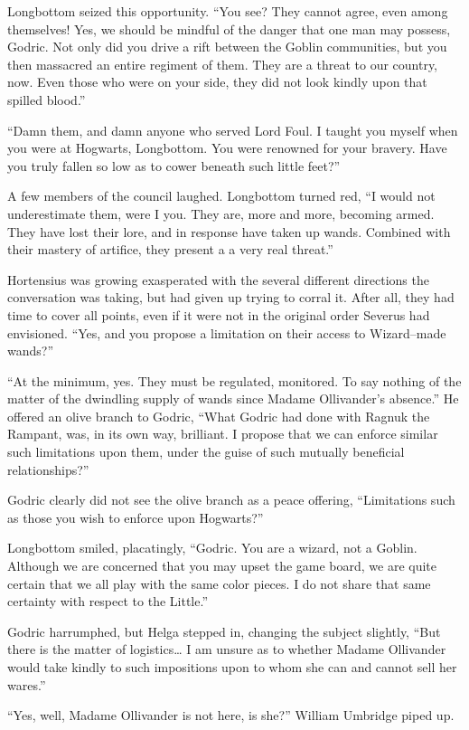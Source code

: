 Longbottom seized this opportunity. “You see? They cannot agree, even among themselves! Yes, we should be mindful of the danger that one man may possess, Godric. Not only did you drive a rift between the Goblin communities, but you then massacred an entire regiment of them. They are a threat to our country, now. Even those who were on your side, they did not look kindly upon that spilled blood.”

“Damn them, and damn anyone who served Lord Foul. I taught you myself when you were at Hogwarts, Longbottom. You were renowned for your bravery. Have you truly fallen so low as to cower beneath such little feet?”

A few members of the council laughed. Longbottom turned red, “I would not underestimate them, were I you. They are, more and more, becoming armed. They have lost their lore, and in response have taken up wands. Combined with their mastery of artifice, they present a a very real threat.”

Hortensius was growing exasperated with the several different directions the conversation was taking, but had given up trying to corral it. After all, they had time to cover all points, even if it were not in the original order Severus had envisioned. “Yes, and you propose a limitation on their access to Wizard\mbox{--}made wands?”

“At the minimum, yes. They must be regulated, monitored. To say nothing of the matter of the dwindling supply of wands since Madame Ollivander’s absence.” He offered an olive branch to Godric, “What Godric had done with Ragnuk the Rampant, was, in its own way, brilliant. I propose that we can enforce similar such limitations upon them, under the guise of such mutually beneficial relationships?”

Godric clearly did not see the olive branch as a peace offering, “Limitations such as those you wish to enforce upon Hogwarts?”

Longbottom smiled, placatingly, “Godric. You are a wizard, not a Goblin. Although we are concerned that you may upset the game board, we are quite certain that we all play with the same color pieces. I do not share that same certainty with respect to the Little.”

Godric harrumphed, but Helga stepped in, changing the subject slightly, “But there is the matter of logistics… I am unsure as to whether Madame Ollivander would take kindly to such impositions upon to whom she can and cannot sell her wares.”

“Yes, well, Madame Ollivander is not here, is she?” William Umbridge piped up.

